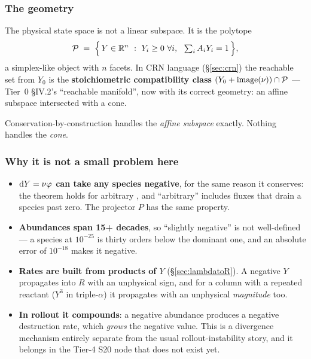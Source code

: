 \subsubsection{The geometry}
\label{sec:posgeometry}

The physical state space is not a linear subspace. It is the polytope
%
\begin{equation}
\mathcal{P} \;=\; \Bigl\{\,Y \in \mathbb{R}^n \ :\ Y_i \ge 0\ \forall i,\ \
                  \textstyle\sum_i A_iY_i = 1 \,\Bigr\},
\label{eq:polytope}
\end{equation}
%
a simplex-like object with $n$ facets. In CRN language (\S\ref{sec:crn}) the
reachable set from $Y_0$ is the \textbf{stoichiometric compatibility class}
$(Y_0 + \operatorname{image}(\nu)) \cap \mathcal{P}$ --- Tier~0 \S IV.2's ``reachable
manifold'', now with its correct geometry: an affine subspace intersected with a
cone.

Conservation-by-construction handles the \emph{affine subspace} exactly. Nothing
handles the \emph{cone}.

\subsubsection{Why it is not a small problem here}
\label{sec:posnotsmall}

\begin{itemize}
\item \textbf{$\mathrm{d} Y = \nu\varphi$ can take any species negative}, for the same
  reason it conserves: the theorem holds for arbitrary \netflux, and
  ``arbitrary'' includes fluxes that drain a species past zero. The projector
  $P$ has the same property.
\item \textbf{Abundances span 15+ decades}, so ``slightly negative'' is not
  well-defined --- a species at $10^{-25}$ is thirty orders below the dominant
  one, and an absolute error of $10^{-18}$ makes it negative.
\item \textbf{Rates are built from products of $Y$} (\S\ref{sec:lambdatoR}). A
  negative $Y$ propagates into $R$ with an unphysical sign, and for a column
  with a repeated reactant ($Y^3$ in triple-$\alpha$) it propagates with an
  unphysical \emph{magnitude} too.
\item \textbf{In rollout it compounds}: a negative abundance produces a negative
  destruction rate, which \emph{grows} the negative value. This is a divergence
  mechanism entirely separate from the usual rollout-instability story, and it
  belongs in the Tier-4 S20 node that does not exist yet.
\end{itemize}

